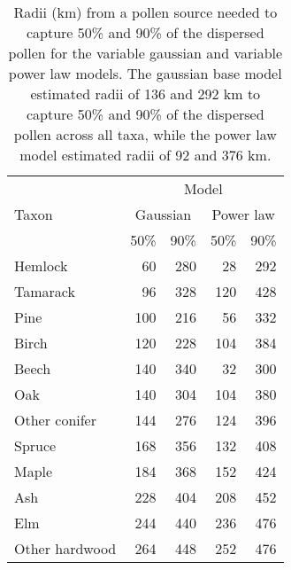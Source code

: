 \begin{table}
\begin{center}
\begin{tabular}{lrrrr} 
\toprule
      & \multicolumn{4}{c}{Model} \\  \cmidrule(lr){2-5}
Taxon & \multicolumn{2}{c}{Gaussian} & \multicolumn{2}{c}{Power law} \\  \cmidrule(lr){2-3}  \cmidrule(lr){4-5}
      & 50\% & 90\% & 50\% & 90\% \\
\cmidrule(lr){2-3}  \cmidrule(lr){4-5}
Hemlock        & 60  & 280 & 28  & 292 \\
Tamarack       &  96 & 328 & 120 & 428 \\
Pine           & 100 & 216 & 56  & 332 \\
Birch          & 120 & 228 & 104 & 384 \\
Beech          & 140 & 340 & 32  & 300 \\
Oak            & 140 & 304 & 104 & 380 \\
Other conifer  & 144 & 276 & 124 & 396 \\ 
Spruce         & 168 & 356 & 132 & 408 \\
Maple          & 184 & 368 & 152 & 424 \\
Ash            & 228 & 404 & 208 & 452 \\
Elm            & 244 & 440 & 236 & 476 \\
Other hardwood & 264 & 448 & 252 & 476 \\
 \bottomrule
\end{tabular}
\caption{Radii (km) from a pollen source needed to capture 50\% and 90\% of
  the dispersed pollen for the variable gaussian and variable power
  law models. The gaussian base model estimated radii of 136 and 292
  km to capture 50\% and 90\% of the dispersed pollen across all taxa, while the power
  law model estimated radii of 92 and 376 km.}
\end{center}
\label{table:pollen_acc}
\vspace{2cm}
\end{table}
